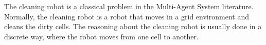 \label{sec:introduction}
The cleaning robot is a classical problem in the Multi-Agent System literature.
Normally, the cleaning robot is a robot that moves in a grid environment and cleans the dirty cells.
The reasoning about the cleaning robot is usually done in a discrete way, where the robot moves from one cell to another.